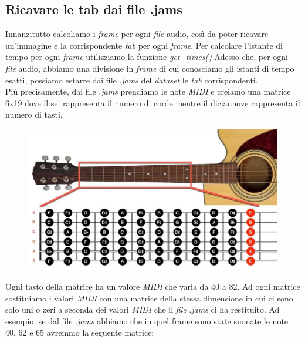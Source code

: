 \subsection{Ricavare le tab dai file .jams}
Innanzitutto calcoliamo i \textit{frame} per ogni \textit{file} audio, così da poter ricavare un'immagine e la corrispondente \textit{tab} per ogni \textit{frame}. Per calcolare l'istante di tempo per ogni \textit{frame} utilizziamo la funzione \textit{get\_times()}
\vspace*{2ex}
\vspace*{2ex}
Adesso che, per ogni \textit{file} audio, abbiamo una divisione in \textit{frame} di cui conosciamo gli istanti di tempo esatti, possiamo estarre dai file .\textit{jams} del \textit{dataset} le \textit{tab} corrispondenti.\\ Più precisamente, dai file .\textit{jams} prendiamo le note \textit{MIDI} e creiamo una matrice 6x19 dove il sei rappresenta il numero di corde mentre il diciannove rappresenta il numero di tasti.
\begin{figure}[H]
	\centering
	\includegraphics[scale=0.30]{./images/img12.jpg}
\end{figure}
Ogni tasto della matrice ha un valore \textit{MIDI} che varia da 40 a 82.
\vspace*{2ex}
\vspace*{2ex}
Ad ogni matrice sostituiamo i valori \textit{MIDI} con una matrice della stessa dimensione in cui ci sono solo uni o zeri a seconda dei valori \textit{MIDI} che il \textit{file} .\textit{jams} ci ha restituito. Ad esempio, se dal file .\textit{jams} abbiamo che in quel frame sono state suonate le note 40, 62 e 65 avremmo la seguente matrice:
\vspace*{2ex}

